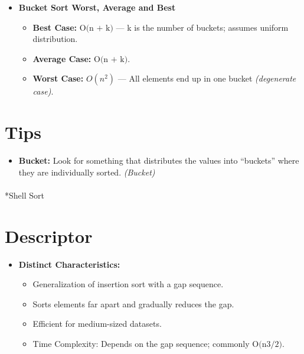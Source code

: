 \documentclass[
  letterpaper,
  DIV=11,
  numbers=noendperiod]{scrreprt}
\makeatletter
\let\oldparagraph\paragraph
\renewcommand{\paragraph}{
    \@ifstar
      \xxxParagraphStar
      \xxxParagraphNoStar
  }
\newcommand{\xxxParagraphStar}[1]{\oldparagraph*{#1}\mbox{}}
\newcommand{\xxxParagraphNoStar}[1]{\oldparagraph{#1}\mbox{}}
\providecommand{\tightlist}{%
  \setlength{\itemsep}{0pt}\setlength{\parskip}{0pt}}
\makeatother
\begin{document}
\begin{itemize}
\item
  \textbf{Bucket Sort Worst, Average and Best}

  \begin{itemize}
  \tightlist
  \item
    \textbf{Best Case:} \(\text{O(n + k)}\) --- k is the number of
    buckets; assumes uniform distribution.
  \item
    \textbf{Average Case:} \(\text{O(n + k)}\).
  \item
    \textbf{Worst Case:} \(O(n^2)\) --- All elements end up in one
    bucket \emph{(degenerate case)}.
  \end{itemize}
\end{itemize}

\section{Tips}

\begin{itemize}
\tightlist
\item
  \textbf{Bucket:} Look for something that distributes the values into
  ``buckets'' where they are individually sorted. \emph{(Bucket)}
\end{itemize}

\paragraph*{Shell Sort}\label{shell-sort}

\section{Descriptor}

\begin{itemize}
\item
  \textbf{Distinct Characteristics:}

  \begin{itemize}
  \tightlist
  \item
    Generalization of insertion sort with a gap sequence.
  \item
    Sorts elements far apart and gradually reduces the gap.
  \item
    Efficient for medium-sized datasets.
  \item
    Time Complexity: Depends on the gap sequence; commonly
    \(\text{O(n3/2)}\).
  \end{itemize}
\end{itemize}
\end{document}
